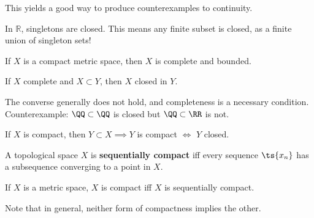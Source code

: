 \begin{proposition}[?]

This yields a good way to produce counterexamples to continuity.

\end{proposition}

In \(\mathbb{R}\), singletons are closed. This means any finite subset
is closed, as a finite union of singleton sets!

\begin{proposition}[?]

If \(X\) is a compact metric space, then \(X\) is complete and bounded.

\end{proposition}

\begin{proposition}[?]

If \(X\) complete and \(X \subset Y\), then \(X\) closed in \(Y\).

\end{proposition}

\begin{remark}

The converse generally does not hold, and completeness is a necessary
condition. Counterexample: \(\QQ\subset \QQ\) is closed but
\(\QQ\subset\RR\) is not.

\end{remark}

\begin{proposition}[?]

If \(X\) is compact, then \(Y \subset X \implies Y\) is compact \(\iff\)
\(Y\) closed.

\end{proposition}

\begin{definition}

A topological space \(X\) is \textbf{sequentially compact} iff every
sequence \(\ts{x_n}\) has a subsequence converging to a point in \(X\).

\end{definition}

\begin{proposition}

If \(X\) is a metric space, \(X\) is compact iff \(X\) is sequentially
compact.

\end{proposition}

\begin{remark}

Note that in general, neither form of compactness implies the other.

\end{remark}

